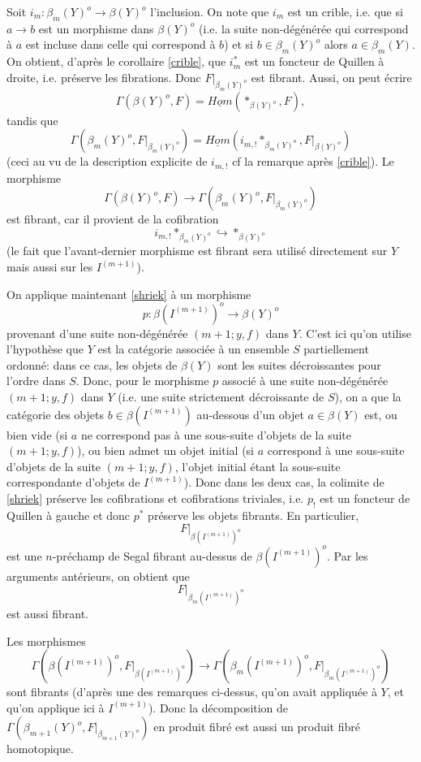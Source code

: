 \documentclass[12pt]{article}
\begin{document}
Soit $i_m: \beta_m (Y)^o\rightarrow \beta (Y)^o$ l'inclusion. On note que
$i_m$ est un crible, i.e.  que si
$a\rightarrow b$ est un morphisme dans $\beta (Y)^o$ (i.e. la suite
non-d\'eg\'en\'er\'ee qui correspond \`a $a$ est incluse dans celle qui
correspond \`a $b$) et si $b\in \beta _m(Y)^o$ alors $a\in \beta _m(Y)$. On
obtient, d'apr\`es le corollaire \ref{crible}, que $i_m^{\ast}$ est un
foncteur de
Quillen \`a droite, i.e. pr\'eserve les fibrations. Donc $F|_{\beta
_m(Y)^o}$ est
fibrant. Aussi, on peut \'ecrire
$$
\Gamma (\beta (Y)^o, F) =
\underline{Hom}(\ast_{\beta (Y)^o}, F),
$$
tandis que
$$
\Gamma (\beta _m(Y)^o, F|_{\beta _m(Y)^o}) = \underline{Hom}(i_{m,!}\ast_{\beta
_m(Y)^o}, F|_{\beta (Y)^o})
$$
(ceci au vu de la description explicite de $i_{m,!}$ cf la remarque
apr\`es \ref{crible}). Le morphisme
$$
\Gamma (\beta (Y)^o, F)
\rightarrow
\Gamma (\beta _m(Y)^o, F|_{\beta _m(Y)^o})
$$
est fibrant, car il
provient de la cofibration
$$
i_{m,!}\ast_{\beta
_m(Y)^o}\hookrightarrow \ast _{\beta (Y)^o}
$$
(le fait que l'avant-dernier morphisme est fibrant sera utilis\'e
directement sur $Y$ mais aussi sur les $I^{(m+1)}$).

On applique maintenant \ref{shriek} \`a un morphisme
$$
p: \beta (I^{(m+1)})^o\rightarrow \beta (Y)^o
$$
provenant d'une suite non-d\'eg\'en\'er\'ee $(m+1; y,f)$ dans $Y$. C'est ici
qu'on utilise l'hy\-po\-th\`e\-se que $Y$ est la cat\'egorie associ\'ee \`a un
ensemble $S$ partiellement ordonn\'e: dans ce cas, les objets de $\beta
(Y)$ sont les suites d\'ecroissantes
pour l'ordre dans $S$. Donc, pour le morphisme
$p$ associ\'e \`a une suite non-d\'eg\'en\'er\'ee $(m+1; y,f)$ dans $Y$ (i.e.
une suite strictement d\'ecroissante de $S$), on a que la cat\'egorie des objets
$b\in \beta (I^{(m+1)})$ au-dessous d'un objet  $a\in \beta (Y)$ est, ou bien
vide (si $a$ ne correspond pas \`a une sous-suite d'objets de la suite $(m+1;
y,f)$), ou bien admet un objet initial (si $a$ correspond \`a une sous-suite
d'objets de la suite $(m+1; y,f)$, l'objet initial \'etant la sous-suite
correspondante d'objets de $I^{(m+1)}$). Donc dans les deux cas, la
colimite de
\ref{shriek} pr\'eserve les cofibrations et cofibrations triviales, i.e. $p_!$
est un foncteur de Quillen \`a gauche et donc $p^{\ast}$ pr\'eserve les objets
fibrants.
En particulier,
$$
F|_{\beta (I^{(m+1)})^o}
$$
est une $n$-pr\'echamp de Segal fibrant au-dessus de $\beta (I^{(m+1)})^o$.
Par les
arguments ant\'erieurs, on obtient que
$$
F|_{\beta _m(I^{(m+1)})^o}
$$
est aussi fibrant.

Les morphismes
$$
\Gamma (\beta (I^{(m+1)})^o,
F|_{\beta (I^{(m+1)})^o}) \rightarrow
\Gamma (\beta _m(I^{(m+1)})^o, F|_{\beta _m(I^{(m+1)})^o})
$$
sont fibrants (d'apr\`es une des remarques ci-dessus,
qu'on avait appliqu\'ee \`a $Y$, et
qu'on applique ici \`a $I^{(m+1)}$). Donc la d\'ecomposition de $\Gamma (\beta
_{m+1}(Y)^o, F|_{\beta _{m+1}(Y)^o})$ en produit fibr\'e est
aussi un produit fibr\'e
homotopique.
\end{document}
